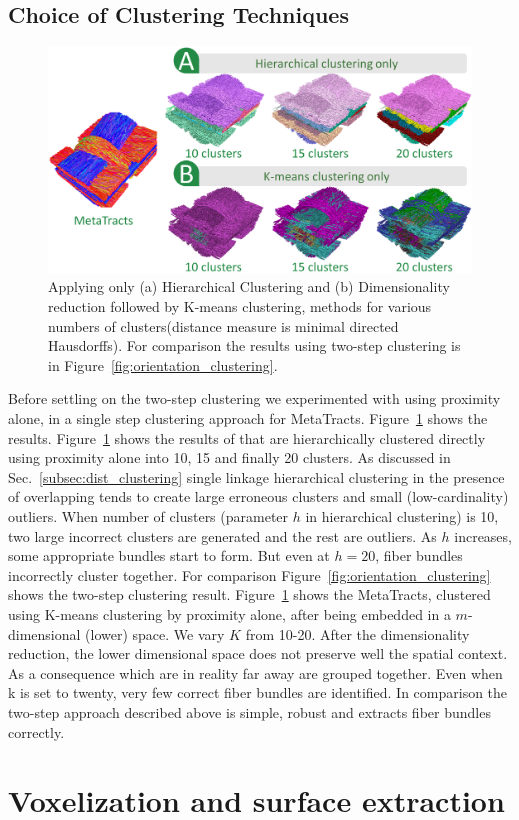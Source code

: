 \subsection{Choice of Clustering Techniques}\label{subsec:clus_choice}
\begin{figure}[htb]
	\centering
	\includegraphics[width=\linewidth]{images/comparison_all.eps}
	\caption{Applying only (a) Hierarchical Clustering and (b) Dimensionality reduction followed by K-means clustering, methods for various numbers of clusters(distance measure is minimal directed Hausdorffs).
		For comparison the results using two-step clustering is in Figure~\ref{fig:orientation_clustering}.}
	\label{fig:comparison}
\end{figure} 
Before settling on the two-step clustering we experimented with using proximity alone, in a single step clustering approach for MetaTracts. 
Figure~\ref{fig:comparison} shows the results. Figure~\ref{fig:comparison} shows the results of \mt that are hierarchically clustered directly using proximity alone into 10, 15 and finally 20 clusters. 
As discussed in Sec.~\ref{subsec:dist_clustering} single linkage hierarchical clustering in the presence of overlapping \mt tends to create large erroneous clusters and small (low-cardinality) outliers.
When number of clusters (parameter $h$ in hierarchical clustering) is 10, two large incorrect clusters are generated and the rest are outliers. As $h$ increases, some appropriate bundles start to form. But even at $h=20$, fiber bundles incorrectly cluster together. For comparison Figure~\ref{fig:orientation_clustering} shows the two-step clustering result. 
Figure~\ref{fig:comparison} shows the MetaTracts, clustered using K-means clustering by proximity alone, after being embedded in a $m$-dimensional (lower) space. We vary $K$ from 10-20. After the dimensionality reduction, the lower dimensional space does not preserve well the spatial context. As a consequence \mt which are in reality far away are grouped together. Even when k is set to twenty, very few correct fiber bundles are identified.  In comparison the two-step approach described above is simple, robust and extracts fiber bundles correctly.
\section{Voxelization and surface extraction}